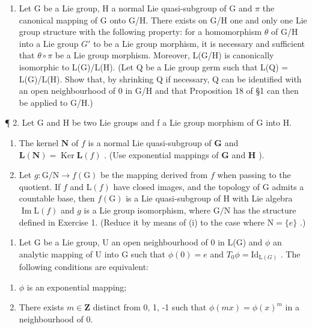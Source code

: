 
\begin{enumerate}
\def\labelenumi{\arabic{enumi}.}
\tightlist
\item
  Let G be a Lie group, H a normal Lie quasi-subgroup of G and \(\pi\) the canonical mapping of G onto G/H. There exists on G/H one and only one Lie group structure with the following property: for a homomorphism \(\theta\) of G/H into a Lie group \(G'\) to be a Lie group morphism, it is necessary and sufficient that \(\theta \circ \pi\) be a Lie group morphism. Moreover, L(G/H) is canonically isomorphic to L(G)/L(H). (Let Q be a Lie group germ such that L(Q) = L(G)/L(H). Show that, by shrinking Q if necessary, Q can be identified with an open neighbourhood of 0 in G/H and that Proposition 18 of §1 can then be applied to G/H.)
\end{enumerate}

¶ 2. Let G and H be two Lie groups and f a Lie group morphism of G into H.

\begin{enumerate}
\def\labelenumi{(\roman{enumi})}
\item
  The kernel \(\mathbf{N}\) of \(f\) is a normal Lie quasi-subgroup of \(\mathbf{G}\) and \(\mathbf{L}(\mathbf{N}) = \operatorname{Ker} \mathbf{L}(f)\) . (Use exponential mappings of \(\mathbf{G}\) and \(\mathbf{H}\) ).
\item
  Let \(g \colon \mathrm{G} / \mathrm{N} \to f(\mathrm{G})\) be the mapping derived from \(f\) when passing to the quotient. If \(f\) and \(\mathrm{L}(f)\) have closed images, and the topology of \(\mathrm{G}\) admits a countable base, then \(f(\mathrm{G})\) is a Lie quasi-subgroup of \(\mathrm{H}\) with Lie algebra \(\operatorname{Im} \mathrm{L}(f)\) and \(g\) is a Lie group isomorphism, where \(\mathrm{G} / \mathrm{N}\) has the structure defined in Exercise 1. (Reduce it by means of (i) to the case where \(\mathrm{N} = \{e\}\) .)
\end{enumerate}

\begin{enumerate}
\def\labelenumi{\arabic{enumi}.}
\setcounter{enumi}{2}
\tightlist
\item
  Let G be a Lie group, U an open neighbourhood of 0 in L(G) and \(\phi\) an analytic mapping of U into G such that \(\phi(0) = e\) and \(T_{0}\phi = \mathrm{Id}_{\mathrm{L}(G)}\) . The following conditions are equivalent:
\end{enumerate}

\begin{enumerate}
\def\labelenumi{(\alph{enumi})}
\item
  \(\phi\) is an exponential mapping;
\item
  There exists \(m \in \mathbf{Z}\) distinct from 0, 1, -1 such that \(\phi(mx) = \phi(x)^m\) in a neighbourhood of 0.
\end{enumerate}

